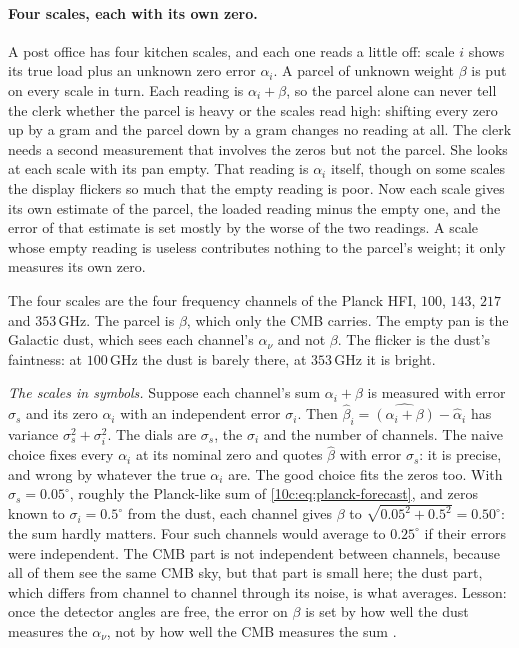 \paragraph{Four scales, each with its own zero.} A post office has four kitchen scales, and each one reads a little
off: scale $i$ shows its true load plus an unknown zero error $\alpha_i$. A parcel of unknown weight $\beta$ is put on
every scale in turn. Each reading is $\alpha_i+\beta$, so the parcel alone can never tell the clerk whether the
parcel is heavy or the scales read high: shifting every zero up by a gram and the parcel down by a gram changes no
reading at all. The clerk needs a second measurement that involves the zeros but not the parcel. She looks at each
scale with its pan empty. That reading is $\alpha_i$ itself, though on some scales the display flickers so much that
the empty reading is poor. Now each scale gives its own estimate of the parcel, the loaded reading minus the empty
one, and the error of that estimate is set mostly by the worse of the two readings. A scale whose empty reading is
useless contributes nothing to the parcel's weight; it only measures its own zero.

The four scales are the four frequency channels of the Planck HFI, $100$, $143$, $217$ and $353\,$GHz. The parcel is
$\beta$, which only the CMB carries. The empty pan is the Galactic dust, which sees each channel's $\alpha_\nu$ and
not $\beta$. The flicker is the dust's faintness: at $100\,$GHz the dust is barely there, at $353\,$GHz it is bright.

\emph{The scales in symbols.} Suppose each channel's sum $\alpha_i+\beta$ is measured with error $\sigma_s$ and its
zero $\alpha_i$ with an independent error $\sigma_i$. Then $\hat\beta_i=\widehat{(\alpha_i+\beta)}-\hat\alpha_i$ has
variance $\sigma_s^2+\sigma_i^2$. The dials are $\sigma_s$, the $\sigma_i$ and the number of channels. The naive choice
fixes every $\alpha_i$ at its nominal zero and quotes $\hat\beta$ with error $\sigma_s$: it is precise, and wrong by
whatever the true $\alpha_i$ are. The good choice fits the zeros too. With $\sigma_s=0.05^\circ$, roughly the
Planck-like sum of \eqref{10c:eq:planck-forecast}, and zeros known to $\sigma_i=0.5^\circ$ from the dust, each channel
gives $\beta$ to $\sqrt{0.05^2+0.5^2}=0.50^\circ$: the sum hardly matters. Four such channels would average to
$0.25^\circ$ if their errors were independent. The CMB part is not independent between channels, because all of them
see the same CMB sky, but that part is small here; the dust part, which differs from channel to channel through its
noise, is what averages. Lesson: once the detector angles are free, the error on $\beta$ is set by how well the dust
measures the $\alpha_\nu$, not by how well the CMB measures the sum \cite{Minami2019}.

